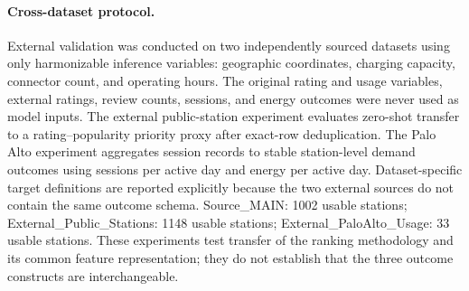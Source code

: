\paragraph{Cross-dataset protocol.}
External validation was conducted on two independently sourced datasets using only harmonizable inference variables: geographic coordinates, charging capacity, connector count, and operating hours. The original rating and usage variables, external ratings, review counts, sessions, and energy outcomes were never used as model inputs. The external public-station experiment evaluates zero-shot transfer to a rating--popularity priority proxy after exact-row deduplication. The Palo Alto experiment aggregates session records to stable station-level demand outcomes using sessions per active day and energy per active day. Dataset-specific target definitions are reported explicitly because the two external sources do not contain the same outcome schema. Source_MAIN: 1002 usable stations; External_Public_Stations: 1148 usable stations; External_PaloAlto_Usage: 33 usable stations. These experiments test transfer of the ranking methodology and its common feature representation; they do not establish that the three outcome constructs are interchangeable.
